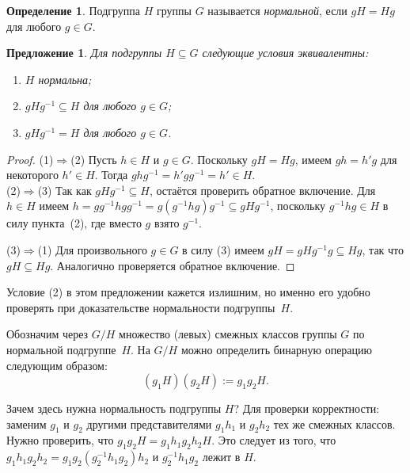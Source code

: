 \documentclass[a4paper,10pt]{amsart}
\newtheorem{proposition}{Предложение}
\theoremstyle{definition}
\newtheorem{definition}{Определение}
\theoremstyle{remark}
\begin{document}
\begin{definition}
Подгруппа $H$ группы $G$ называется {\it нормальной}, если $gH=Hg$
для любого $g\in G$.
\end{definition}

\begin{proposition}
Для подгруппы $H \subseteq G$ следующие условия эквивалентны:

\vspace{-2mm}
\begin{enumerate}
\item[(1)]
$H$ нормальна;

\item[(2)]
$gHg^{-1} \subseteq H$ для любого $g \in G$;

\item[(3)]
$gHg^{-1}=H$ для любого $g\in G$.
\end{enumerate}
\end{proposition}

\vspace{-6mm}

\begin{proof}
(1)$\Rightarrow$(2) Пусть $h \in H$ и $g \in G$. Поскольку $gH =
Hg$, имеем $gh = h'g$ для некоторого $h' \in H$. Тогда $ghg^{-1} =
h'gg^{-1} = h' \in H$.\\
(2)$\Rightarrow$(3) Так как $gHg^{-1} \subseteq H$, остаётся
проверить обратное включение. Для $h \in H$ имеем $h = gg^{-1} h g
g^{-1} = g(g^{-1}hg)g^{-1} \subseteq gHg^{-1}$, поскольку $g^{-1}hg
\in H$ в силу пункта~(2), где вместо $g$ взято $g^{-1}$.

(3)$\Rightarrow$(1) Для произвольного $g \in G$ в силу (3) имеем $gH
= gHg^{-1} g \subseteq Hg$, так что $gH \subseteq Hg$. Аналогично
проверяется обратное включение.
\end{proof}
\vspace{-1mm}

Условие (2) в этом предложении кажется излишним, но именно его
удобно проверять при доказательстве нормальности подгруппы~$H$.

Обозначим через $G/H$ множество (левых) смежных классов группы $G$
по нормальной подгруппе~$H$. На $G/H$ можно определить бинарную
операцию следующим образом:
$$
(g_1H)(g_2H):=g_1g_2H.
$$

Зачем здесь нужна нормальность подгруппы $H$? Для проверки
корректности: заменим $g_1$ и $g_2$ другими представителями $g_1h_1$
и $g_2h_2$ тех же смежных классов. Нужно проверить, что
$g_1g_2H=g_1h_1g_2h_2H$. Это следует из того, что
$g_1h_1g_2h_2=g_1g_2(g_2^{-1}h_1g_2)h_2$ и $g_2^{-1}h_1g_2$ лежит в
$H$.
\end{document}
